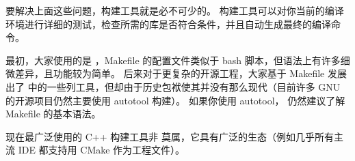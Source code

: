 要解决上面这些问题，构建工具就是必不可少的。 构建工具可以对你当前的编译环境进行详细的测试，检查所需的库是否符合条件，并且自动生成最终的编译命令。

最初，大家使用的是 ，Makefile 的配置文件类似于 bash 脚本，但语法上有许多细微差异，且功能较为简单。 后来对于更复杂的开源工程，大家基于 Makefile 发展出了  中的一些列工具，但却由于历史包袱使其并没有那么现代（目前许多 GNU 的开源项目仍然主要使用 autotool 构建）。 如果你使用 autotool， 仍然建议了解 Makefile 的基本语法。

现在最广泛使用的 C++ 构建工具非  莫属，它具有广泛的生态（例如几乎所有主流 IDE 都支持用 CMake 作为工程文件）。
